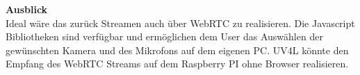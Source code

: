 \textbf{Ausblick}\\
Ideal wäre das zurück Streamen auch über WebRTC zu realisieren. Die Javascript Bibliotheken sind verfügbar und ermöglichen dem User das Auswählen der gewünschten Kamera und des Mikrofons auf dem eigenen PC. UV4L könnte den Empfang des WebRTC Streams auf dem Raspberry PI ohne Browser realisieren.
